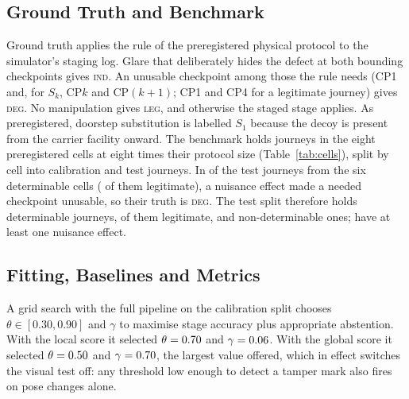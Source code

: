 \documentclass[conference]{IEEEtran}
\newcommand{\LEG}{\textsc{leg}}
\newcommand{\DEG}{\textsc{deg}}
\newcommand{\IND}{\textsc{ind}}
\begin{document}
\subsection{Ground Truth and Benchmark}
\label{sec:truth}
Ground truth applies the rule of the preregistered physical protocol to the simulator's staging log. Glare that deliberately hides the defect at both bounding checkpoints gives \IND. An unusable checkpoint among those the rule needs (CP1 and, for $S_k$, CP$k$ and CP$(k{+}1)$; CP1 and CP4 for a legitimate journey) gives \DEG. No manipulation gives \LEG, and otherwise the staged stage applies. As preregistered, doorstep substitution is labelled $S_1$ because the decoy is present from the carrier facility onward. The benchmark holds \NTotal{} journeys in the eight preregistered cells at eight times their protocol size (Table~\ref{tab:cells}), split by cell into \NCal{} calibration and \NTest{} test journeys. In \NNuisDeg{} of the \NCellDet{} test journeys from the six determinable cells (\NLegitNuisDeg{} of them legitimate), a nuisance effect made a needed checkpoint unusable, so their truth is \DEG. The test split therefore holds \NDet{} determinable journeys, \NLegitDet{} of them legitimate, and \NNonDet{} non-determinable ones; \NNuis{} have at least one nuisance effect.

\subsection{Fitting, Baselines and Metrics}
A grid search with the full pipeline on the calibration split chooses $\theta \in [0.30, 0.90]$ and $\gamma$ to maximise stage accuracy plus appropriate abstention. With the local score it selected $\theta=0.70$ and $\gamma=0.06$. With the global score it selected $\theta=0.50$ and $\gamma=0.70$, the largest value offered, which in effect switches the visual test off: any threshold low enough to detect a tamper mark also fires on pose changes alone.
\end{document}
